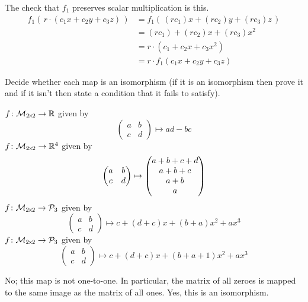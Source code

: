\begin{exercises}
\begin{answer}
      The check that $f_1$ preserves scalar multiplication is this.
      \begin{align*}
        f_1(\,r\cdot (c_1x+c_2y+c_3z)\,)
          &=f_1(\,(rc_1)x+(rc_2)y+(rc_3)z\,)  \\
          &=(rc_1)+(rc_2)x+(rc_3)x^2  \\
          &=r\cdot (c_1+c_2x+c_3x^2)  \\
          &=r\cdot f_1(c_1x+c_2y+c_3z)
      \end{align*}
    \end{answer}
  \recommended \item 
   Decide whether each map is an isomorphism
   (if it is an isomorphism then prove it and if it isn't then
   state a condition that it fails to satisfy).
    \begin{exparts}
      \partsitem \( \mbox{$f\colon \mathcal{M}_{2 \! \times \! 2}\to \mathbb{R}$} \) given by
        \begin{equation*}
           \begin{pmatrix}
             a  &b  \\
             c  &d
           \end{pmatrix}
           \mapsto
           ad-bc
        \end{equation*}
      \partsitem \( \mbox{$f\colon \mathcal{M}_{2 \! \times \! 2}\to \mathbb{R}^4$} \) given by
        \begin{equation*}
           \begin{pmatrix}
             a  &b  \\
             c  &d
           \end{pmatrix}
           \mapsto
           \begin{pmatrix} a+b+c+d \\ a+b+c \\ a+b \\ a \end{pmatrix}
        \end{equation*}
      \partsitem \( \mbox{$f\colon \mathcal{M}_{2 \! \times \! 2}\to \mathcal{P}_3$} \) given by
        \begin{equation*}
           \begin{pmatrix}
             a  &b  \\
             c  &d
           \end{pmatrix}
           \mapsto
           c+(d+c)x+(b+a)x^2+ax^3
        \end{equation*}
      \partsitem \( \mbox{$f\colon \mathcal{M}_{2 \! \times \! 2}\to \mathcal{P}_3$} \) given by
        \begin{equation*}
           \begin{pmatrix}
             a  &b  \\
             c  &d
           \end{pmatrix}
           \mapsto
           c+(d+c)x+(b+a+1)x^2+ax^3
        \end{equation*}
    \end{exparts}
  \begin{answer}
    \begin{exparts}
      \partsitem No; this map is not one-to-one.
        In particular, the matrix of all zeroes is mapped to the same
        image as the matrix of all ones.
      \partsitem Yes, this is an isomorphism.


\end{exparts}
\end{answer}
\end{exercises}
